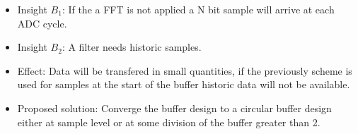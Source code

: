 \begin{itemize}
	\item Insight $B_1$: If the a FFT is not applied a N
	 bit sample
	will arrive at each ADC cycle.
	\item Insight $B_2$: A filter needs historic samples.
	\item Effect: Data will be transfered in small quantities, if the previously
scheme is used for samples at the start of the buffer historic data will not be
available.
	\item Proposed solution: Converge the buffer design to a circular buffer
design either at sample level or at some division of the buffer greater than 2.
\end{itemize}
